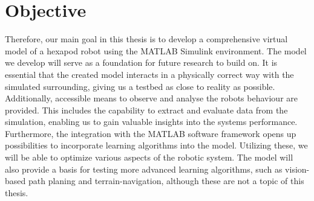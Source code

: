 



\section{Objective}
Therefore, our main goal in this thesis is to develop a comprehensive virtual model of a hexapod robot using the MATLAB Simulink\textsuperscript{\textregistered} environment.
The model we develop will serve as a foundation for future research to build on.
It is essential that the created model interacts in a physically correct way with the simulated surrounding, giving us a testbed as close to reality as possible.
Additionally, accessible means to observe and analyse the robots behaviour are provided.
This includes the capability to extract and evaluate data from the simulation, enabling us to gain valuable insights into the systems performance.
Furthermore, the integration with the MATLAB software framework opens up possibilities to incorporate learning algorithms into the model.
Utilizing these, we will be able to optimize various aspects of the robotic system. 
The model will also provide a basis for testing more advanced learning algorithms, such as vision-based path planing and terrain-navigation, although these are not a topic of this thesis.

